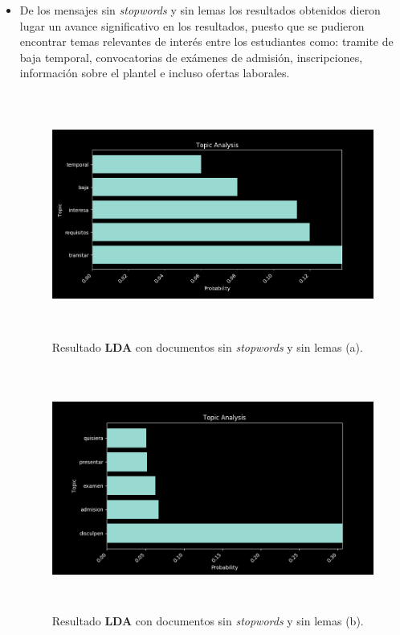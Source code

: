 \begin{itemize}
        \item De los mensajes sin \textit{stopwords} y sin lemas los resultados obtenidos dieron lugar un avance significativo en los resultados, puesto que se pudieron encontrar temas relevantes de interés entre los estudiantes como: tramite de baja temporal, convocatorias de exámenes de admisión, inscripciones, información sobre el plantel e incluso ofertas laborales.
        \begin{figure}[H]
            \centering
            \includegraphics[height=8cm, width=16.5cm]{Latex/Classes/Imagenes/ns_nl-1.png}
            \caption{Resultado \textbf{LDA} con documentos sin \textit{stopwords} y sin lemas (a).}
            \label{fig:ns_nl-1}
        \end{figure}
        \begin{figure}[H]
            \centering
            \includegraphics[height=8cm, width=16.5cm]{Latex/Classes/Imagenes/ns_nl-2.png}
            \caption{Resultado \textbf{LDA} con documentos sin \textit{stopwords} y sin lemas (b).}
            \label{fig:ns_nl-2}

\end{figure}
\end{itemize}
